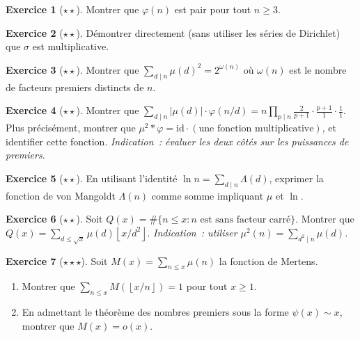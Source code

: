\documentclass[12pt,a4paper,openany]{book}
\theoremstyle{definition}
\newtheorem{exercice}{Exercice}[chapter]
\theoremstyle{plain}
\theoremstyle{remark}
\newcommand{\abs}[1]{\left|#1\right|}
\newcommand{\floor}[1]{\left\lfloor #1 \right\rfloor}
\begin{document}
\begin{exercice}[$\star\star$]
\label{exo:phi-pair}
Montrer que $\varphi(n)$ est pair pour tout $n \geq 3$.
\end{exercice}

\begin{exercice}[$\star\star$]
\label{exo:sigma-multiplicative}
Démontrer directement (sans utiliser les séries de Dirichlet) que $\sigma$ est
multiplicative.
\end{exercice}

\begin{exercice}[$\star\star$]
\label{exo:identite-piltz}
Montrer que $\sum_{d \mid n} \mu(d)^2 = 2^{\omega(n)}$ où $\omega(n)$ est le nombre de
facteurs premiers distincts de $n$.
\end{exercice}

\begin{exercice}[$\star\star$]
\label{exo:mu-carre-formule}
Montrer que $\sum_{d \mid n} \abs{\mu(d)} \cdot \varphi(n/d) = n \prod_{p \mid n}
\frac{2}{p+1} \cdot \frac{p+1}{1} \cdot \frac{1}{1}$.
Plus précisément, montrer que $\mu^2 * \varphi = \mathrm{id} \cdot (\text{une fonction
multiplicative})$, et identifier cette fonction.
\textit{Indication~: évaluer les deux côtés sur les puissances de premiers.}
\end{exercice}

\begin{exercice}[$\star\star$]
\label{exo:inversion-application}
En utilisant l'identité $\ln n = \sum_{d \mid n} \Lambda(d)$, exprimer la fonction de
von Mangoldt $\Lambda(n)$ comme somme impliquant $\mu$ et $\ln$.
\end{exercice}

\begin{exercice}[$\star\star$]
\label{exo:nombre-sans-carre}
Soit $Q(x) = \#\{n \leq x : n \text{ est sans facteur carré}\}$. Montrer que
$Q(x) = \sum_{d \leq \sqrt{x}} \mu(d) \floor{x/d^2}$.
\textit{Indication~: utiliser $\mu^2(n) = \sum_{d^2 \mid n} \mu(d)$.}
\end{exercice}

\begin{exercice}[$\star\star\star$]
\label{exo:mertens}
Soit $M(x) = \sum_{n \leq x} \mu(n)$ la fonction de Mertens.
\begin{enumerate}[label=(\alph*)]
  \item Montrer que $\sum_{n \leq x} M(\floor{x/n}) = 1$ pour tout $x \geq 1$.
  \item En admettant le théorème des nombres premiers sous la forme $\psi(x) \sim x$,
    montrer que $M(x) = o(x)$.
\end{enumerate}
\end{exercice}
\end{document}
